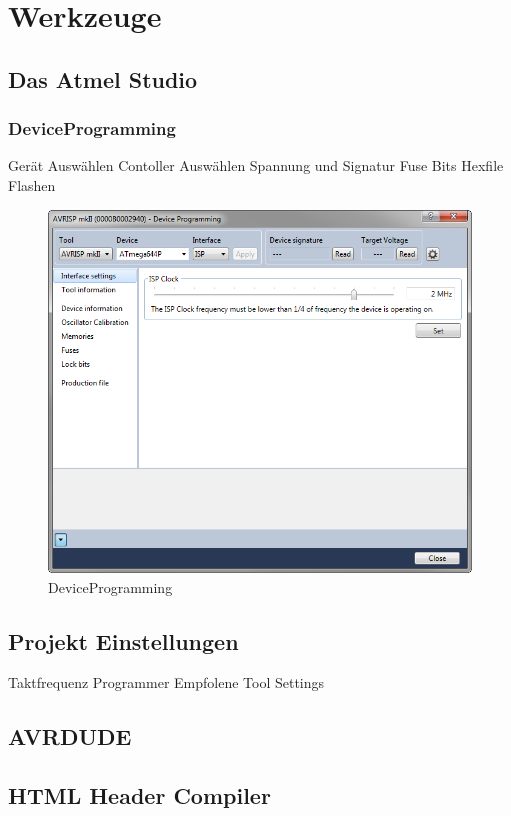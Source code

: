 \chapter{Werkzeuge}

\section{Das Atmel Studio}

\subsection{DeviceProgramming}

Gerät Auswählen
Contoller Auswählen
Spannung und Signatur
Fuse Bits
Hexfile Flashen

\begin{figure}[h]
\centering
\includegraphics[width=13cm]{content/pictures/Anleitung/neuerProzessor/AnleitungNeuerProzessor1.png}
\caption{DeviceProgramming}
\label{fig:B3}
\end{figure}

\section{Projekt Einstellungen}

Taktfrequenz
Programmer
Empfolene Tool Settings

\section{AVRDUDE}

\section{HTML Header Compiler}